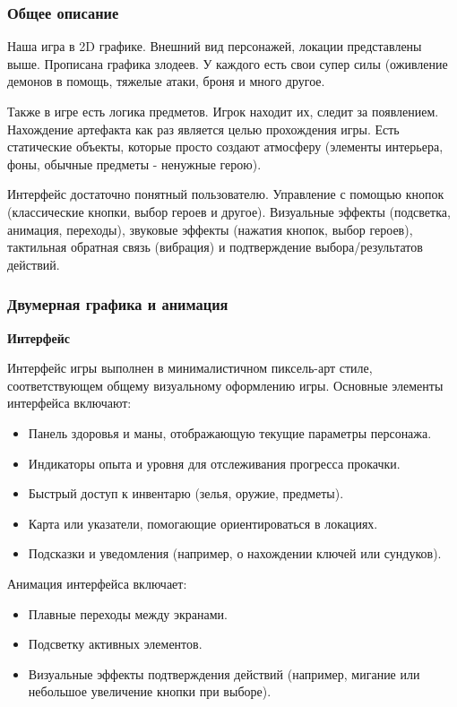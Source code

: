 \documentclass{article}
\begin{document}
\subsubsection{Общее описание}
Наша игра в 2D графике. Внешний вид персонажей, локации представлены выше. Прописана графика злодеев. У каждого есть свои супер силы (оживление демонов в помощь, тяжелые атаки, броня и много другое. 
\par Также в игре есть логика предметов. Игрок находит их, следит за появлением. Нахождение артефакта как раз является целью прохождения игры. Есть статические объекты, которые просто создают атмосферу (элементы интерьера, фоны, обычные предметы - ненужные герою).
\par Интерфейс достаточно понятный пользователю. Управление с помощью кнопок (классические кнопки, выбор героев и другое). Визуальные эффекты (подсветка, анимация, переходы), звуковые эффекты (нажатия кнопок, выбор героев), тактильная обратная связь (вибрация) и подтверждение выбора/результатов действий.

\subsubsection{Двумерная графика и анимация}
\textbf{Интерфейс}

Интерфейс игры выполнен в минималистичном пиксель-арт стиле, соответствующем общему визуальному оформлению игры. Основные элементы интерфейса включают:
\begin{itemize}
    \item Панель здоровья и маны, отображающую текущие параметры персонажа.
    \item Индикаторы опыта и уровня для отслеживания прогресса прокачки.
    \item Быстрый доступ к инвентарю (зелья, оружие, предметы).
    \item Карта или указатели, помогающие ориентироваться в локациях.
    \item Подсказки и уведомления (например, о нахождении ключей или сундуков).
\end{itemize}

Анимация интерфейса включает:
\begin{itemize}
    \item Плавные переходы между экранами.
    \item Подсветку активных элементов.
    \item Визуальные эффекты подтверждения действий (например, мигание или небольшое увеличение кнопки при выборе).
\end{itemize}
\end{document}
